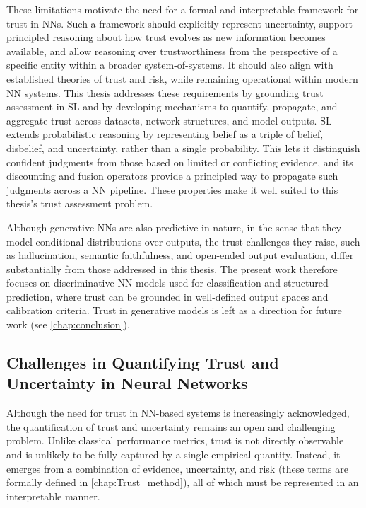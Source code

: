 These limitations motivate the need for a formal and interpretable framework for trust in \acp{NN}. Such a framework should explicitly represent uncertainty, support principled reasoning about how trust evolves as new information becomes available, and allow reasoning over trustworthiness from the perspective of a specific entity within a broader system-of-systems. It should also align with established theories of trust and risk, while remaining operational within modern \ac{NN} systems. This thesis addresses these requirements by grounding trust assessment in \acf{SL} and by developing mechanisms to quantify, propagate, and aggregate trust across datasets, network structures, and model outputs. \ac{SL} extends probabilistic reasoning by representing belief as a triple of belief, disbelief, and uncertainty, rather than a single probability. This lets it distinguish confident judgments from those based on limited or conflicting evidence, and its discounting and fusion operators provide a principled way to propagate such judgments across a NN pipeline. These properties make it well suited to this thesis's trust assessment problem.

Although generative \acp{NN} are also predictive in nature, in the sense that they model conditional distributions over outputs, the trust challenges they raise, such as hallucination, semantic faithfulness, and open-ended output evaluation, differ substantially from those addressed in this thesis. The present work therefore focuses on discriminative \ac{NN} models used for classification and structured prediction, where trust can be grounded in well-defined output spaces and calibration criteria. Trust in generative models is left as a direction for future work (see \cref{chap:conclusion}).

\subsection{Challenges in Quantifying Trust and Uncertainty in Neural Networks}
\label{sec:quantification_challenges}
Although the need for trust in \ac{NN}-based systems is increasingly acknowledged, the quantification of trust and uncertainty remains an open and challenging problem. Unlike classical performance metrics, trust is not directly observable and is unlikely to be fully captured by a single empirical quantity. Instead, it emerges from a combination of evidence, uncertainty, and risk (these terms are formally defined in \cref{chap:Trust_method}), all of which must be represented in an interpretable manner.

